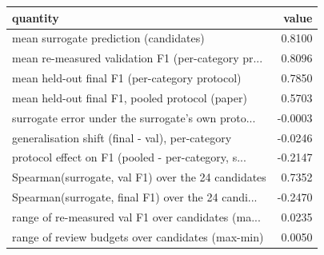 \begin{tabular}{lr}
\toprule
                                          quantity &   value \\
\midrule
            mean surrogate prediction (candidates) &  0.8100 \\
mean re-measured validation F1 (per-category pr... &  0.8096 \\
    mean held-out final F1 (per-category protocol) &  0.7850 \\
   mean held-out final F1, pooled protocol (paper) &  0.5703 \\
surrogate error under the surrogate's own proto... & -0.0003 \\
  generalisation shift (final - val), per-category & -0.0246 \\
protocol effect on F1 (pooled - per-category, s... & -0.2147 \\
Spearman(surrogate, val F1) over the 24 candidates &  0.7352 \\
Spearman(surrogate, final F1) over the 24 candi... & -0.2470 \\
range of re-measured val F1 over candidates (ma... &  0.0235 \\
 range of review budgets over candidates (max-min) &  0.0050 \\
\bottomrule
\end{tabular}
